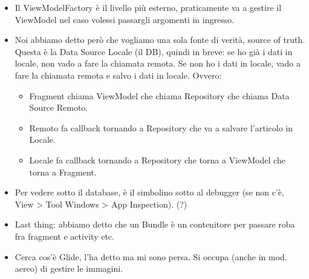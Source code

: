 \begin{itemize}
    \item Il ViewModelFactory è il livello più esterno, praticamente va a gestire il ViewModel nel caso volessi passargli argomenti in ingresso.
    \item Noi abbiamo detto però che vogliamo una sola fonte di verità, source of truth. Questa è la Data Source Locale (il DB), quindi in breve: se ho già i dati in locale, non vado a fare la chiamata remota. Se non ho i dati in locale, vado a fare la chiamata remota e salvo i dati in locale. Ovvero:
    \begin{itemize}
        \item Fragment chiama ViewModel che chiama Repository che chiama Data Source Remoto. 
        \item Remoto fa callback tornando a Repository che va a salvare l'articolo in Locale.
        \item Locale fa callback tornando a Repository che torna a ViewModel che torna a Fragment.
    \end{itemize}
    \item Per vedere sotto il database, è il simbolino sotto al debugger (se non c'è, View > Tool Windows > App Inspection). (?)
    \item Last thing: abbiamo detto che un Bundle è un contenitore per passare roba fra fragment e activity etc.
    \item Cerca cos'è Glide, l'ha detto ma mi sono persa. Si occupa (anche in mod. aereo) di gestire le immagini.
\end{itemize}
